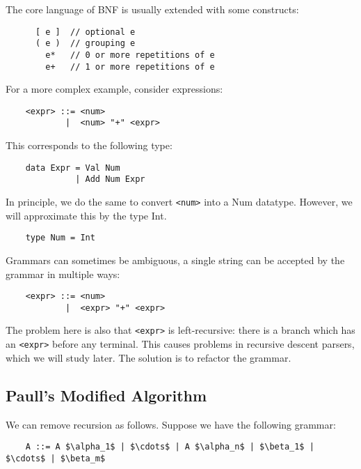 \documentclass[a4paper,12pt]{article}
\theoremstyle{remark}
\begin{document}
  The core language of BNF is usually extended with some constructs:

  \begin{lstlisting}
      [ e ]  // optional e
      ( e )  // grouping e
        e*   // 0 or more repetitions of e
        e+   // 1 or more repetitions of e  \end{lstlisting}

For a more complex example, consider expressions:

\begin{lstlisting}
    <expr> ::= <num>
            |  <num> "+" <expr>  \end{lstlisting}

This corresponds to the following type:

\begin{lstlisting}
    data Expr = Val Num
              | Add Num Expr  \end{lstlisting}

In principle, we do the same to convert \lstinline{<num>} into a Num datatype. However,
we will approximate this by the type Int.

\begin{lstlisting}
    type Num = Int  \end{lstlisting}

Grammars can sometimes be ambiguous, a single string can be accepted by the grammar
in multiple ways:

\begin{lstlisting}
    <expr> ::= <num>
            |  <expr> "+" <expr>  \end{lstlisting}

The problem here is also that \lstinline{<expr>} is left-recursive: there is a branch which
has an \lstinline{<expr>} before any terminal. This causes problems in recursive descent parsers,
which we will study later. The solution is to refactor the grammar.

\subsection{Paull's Modified Algorithm}

We can remove recursion as follows. Suppose we have the following grammar:

\begin{lstlisting}
    A ::= A $\alpha_1$ | $\cdots$ | A $\alpha_n$ | $\beta_1$ | $\cdots$ | $\beta_m$  \end{lstlisting}
\end{document}
